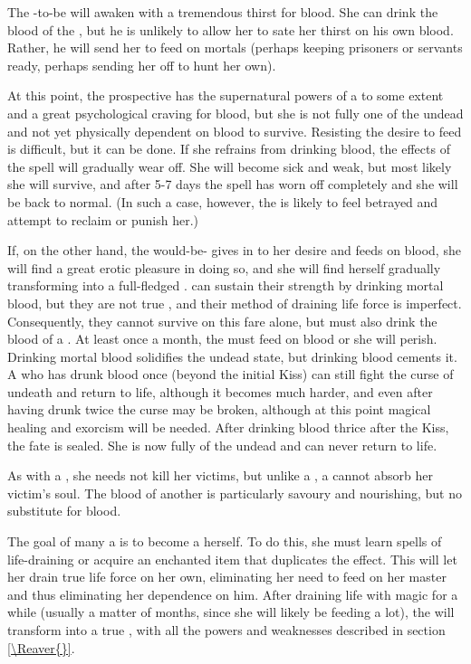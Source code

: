 The \Leech-to-be will awaken with a tremendous thirst for blood. She can drink the blood of the \Reaver, but he is unlikely to allow her to sate her thirst on his own blood. Rather, he will send her to feed on mortals (perhaps keeping prisoners or servants ready, perhaps sending her off to hunt her own). 

At this point, the prospective \Leech{} has the supernatural powers of a \Leech{} to some extent and a great psychological craving for blood, but she is not fully one of the undead and not yet physically dependent on blood to survive. Resisting the desire to feed is difficult, but it can be done. If she refrains from drinking blood, the effects of the spell will gradually wear off. She will become sick and weak, but most likely she will survive, and after 5-7 days the spell has worn off completely and she will be back to normal. (In such a case, however, the \Reaver{} is likely to feel betrayed and attempt to reclaim or punish her.) 

If, on the other hand, the would-be-\Leech{} gives in to her desire and feeds on blood, she will find a great erotic pleasure in doing so, and she will find herself gradually transforming into a full-fledged \Leech{}. \Leeches{} can sustain their strength by drinking mortal blood, but they are not true \Reavers, and their method of draining life force is imperfect. Consequently, they cannot survive on this fare alone, but must also drink the blood of a \Reaver. At least once a month, the \Leech{} must feed on \Reaver{} blood or she will perish. Drinking mortal blood solidifies the \Leechz undead state, but drinking \Reaver{} blood cements it. A \Leech who has drunk \Reaver{} blood once (beyond the initial Kiss) can still fight the curse of undeath and return to life, although it becomes much harder, and even after having drunk twice the curse may be broken, although at this point magical healing and exorcism will be needed. After drinking \Reaver{} blood thrice after the Kiss, the \Leechz fate is sealed. She is now fully of the undead and can never return to life. 

As with a \Reaver, she needs not kill her victims, but unlike a \Reaver, a \Leech{} cannot absorb her victim's soul. The blood of another \Leech{} is particularly savoury and nourishing, but no substitute for \Reaver{} blood. 

The goal of many a \Leech{} is to become a \Reaver{} herself. To do this, she must learn spells of life-draining or acquire an enchanted item that duplicates the effect. This will let her drain true life force on her own, eliminating her need to feed on her master and thus eliminating her dependence on him. After draining life with magic for a while (usually a matter of months, since she will likely be feeding a lot), the \Leech{} will transform into a true \Reaver, with all the powers and weaknesses described in section \ref{\Reaver{}}. 

